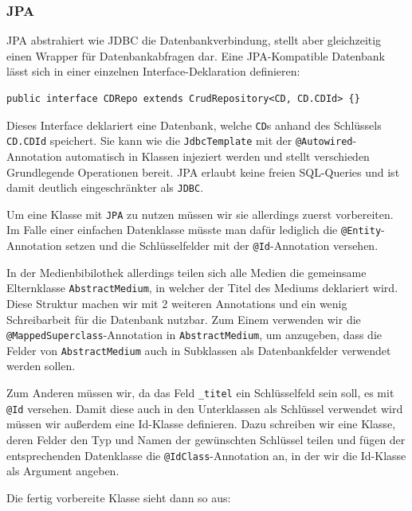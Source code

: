 \documentclass{article}
\begin{document}
\subsubsection{JPA}

JPA abstrahiert wie JDBC die Datenbankverbindung, stellt aber gleichzeitig einen Wrapper für Datenbankabfragen dar. Eine JPA-Kompatible Datenbank lässt sich in einer einzelnen Interface-Deklaration definieren:

\begin{lstlisting}
public interface CDRepo extends CrudRepository<CD, CD.CDId> {}
\end{lstlisting}

Dieses Interface deklariert eine Datenbank, welche \texttt{CD}s anhand des Schlüssels \texttt{CD.CDId} speichert.
Sie kann wie die \texttt{JdbcTemplate} mit der \texttt{@Autowired}-Annotation automatisch in Klassen injeziert werden und stellt verschieden Grundlegende Operationen bereit.
JPA erlaubt keine freien SQL-Queries und ist damit deutlich eingeschränkter als \texttt{JDBC}.

Um eine Klasse mit \texttt{JPA} zu nutzen müssen wir sie allerdings zuerst vorbereiten.
Im Falle einer einfachen Datenklasse müsste man dafür lediglich die \texttt{@Entity}-Annotation setzen und die Schlüsselfelder mit der \texttt{@Id}-Annotation versehen.

In der Medienbibilothek allerdings teilen sich alle Medien die gemeinsame Elternklasse \texttt{AbstractMedium}, in welcher der Titel des Mediums deklariert wird.
Diese Struktur machen wir mit 2 weiteren Annotations und ein wenig Schreibarbeit für die Datenbank nutzbar.
Zum Einem verwenden wir die \texttt{@MappedSuperclass}-Annotation in \texttt{AbstractMedium}, um anzugeben, dass die Felder von \texttt{AbstractMedium} auch in Subklassen als Datenbankfelder verwendet werden sollen.

Zum Anderen müssen wir, da das Feld \texttt{\_titel} ein Schlüsselfeld sein soll, es mit \texttt{@Id} versehen.
Damit diese auch in den Unterklassen als Schlüssel verwendet wird müssen wir außerdem eine Id-Klasse definieren.
Dazu schreiben wir eine Klasse, deren Felder den Typ und Namen der gewünschten Schlüssel teilen und fügen der entsprechenden Datenklasse die \texttt{@IdClass}-Annotation an, in der wir die Id-Klasse als Argument angeben.

Die fertig vorbereite Klasse sieht dann so aus:
\end{document}
